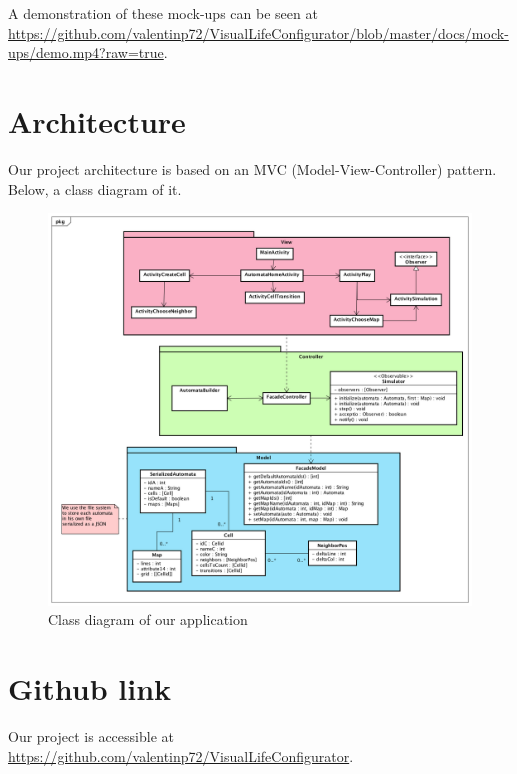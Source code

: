 \documentclass{report}
\begin{document}
\vspace{12pt}
A demonstration of these mock-ups can be seen at \url{https://github.com/valentinp72/VisualLifeConfigurator/blob/master/docs/mock-ups/demo.mp4?raw=true}.


\newpage
\section{Architecture}

Our project architecture is based on an MVC (Model-View-Controller) pattern. Below, a class diagram of it.

\begin{figure}[H]
	\centering
	\includegraphics[width=\linewidth]{../class_diagram.png}
	\caption{Class diagram of our application}
\end{figure}

\section{Github link}
Our project is accessible at \url{https://github.com/valentinp72/VisualLifeConfigurator}.
\end{document}
